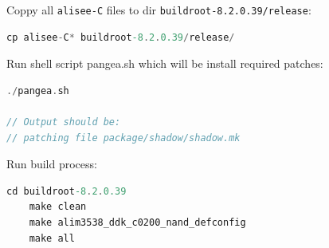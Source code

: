 \documentclass[12pt]{report}
\newcommand{\code}[1]{\texttt{#1}} %
\begin{document}
Coppy all \code{alisee-C} files to dir \code{buildroot-8.2.0.39/release}:
\begin{lstlisting}[language=C]
cp alisee-C* buildroot-8.2.0.39/release/
\end{lstlisting}

Run shell script pangea.sh which will be install required patches:
\begin{lstlisting}[language=C]
    ./pangea.sh 

// Output should be:
// patching file package/shadow/shadow.mk

\end{lstlisting}


Run build process:
\begin{lstlisting}[language=C]
cd buildroot-8.2.0.39
    make clean
    make alim3538_ddk_c0200_nand_defconfig
    make all
\end{lstlisting}
\end{document}
